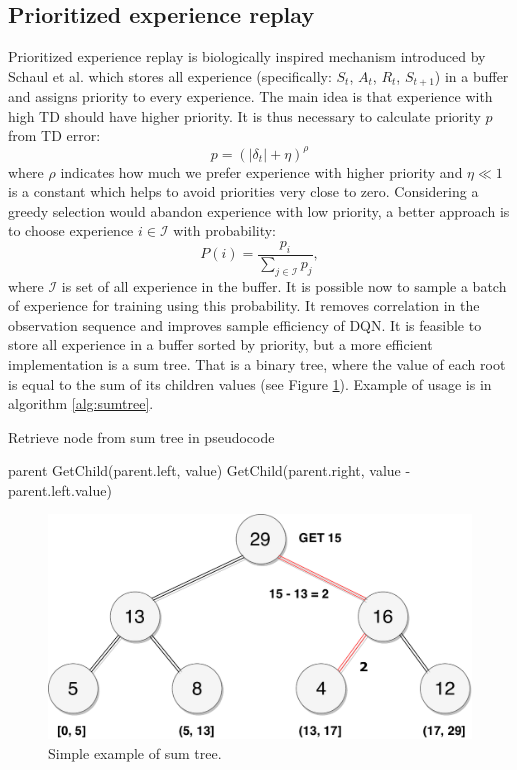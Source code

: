 \clearpage

\subsection{Prioritized experience replay}
Prioritized experience replay is biologically inspired mechanism introduced by Schaul et al. \cite{schaul2015} which stores all experience (specifically: $S_t$, $A_t$, $R_{t}$, $S_{t+1}$) in a buffer and assigns priority to every experience. The main idea is that experience with high TD should have higher priority. It is thus necessary to calculate priority $p$ from TD error:
\begin{equation}
p = (|\delta_t | + \eta)^\rho
\end{equation}
where $\rho$ indicates how much we prefer experience with higher priority and $\eta \ll 1$ is a constant which helps to avoid priorities very close to zero. Considering a greedy selection would abandon experience with low priority, a better approach is to choose experience $i \in \mathcal{I}$ with probability:
\begin{equation}
P(i) = \frac{p_i}{\sum\limits_{j \in \mathcal{I}} p_j},
\end{equation}
where $\mathcal{I}$ is set of all experience in the buffer. It is possible now to sample a batch of experience for training using this probability. It removes correlation in the observation sequence and improves sample efficiency of DQN. It is feasible to store all experience in a buffer sorted by priority, but a more efficient implementation is a sum tree. That is a binary tree, where the value of each root is equal to the sum of its children values (see Figure \ref{fig:sumtree}). Example of usage is in algorithm \ref{alg:sumtree}.
\begin{algorithm}
\caption{Retrieve node from sum tree in pseudocode}
\label{alg:sumtree}
\begin{algorithmic}[1]
 \Return parent \EndIf
{} 
\State \Return GetChild(parent.left, value)
\Else 
\State \Return GetChild(parent.right, value - parent.left.value)
\EndIf
\EndFunction
\end{algorithmic}
\end{algorithm}
\begin{figure}[H]
\centering
\includegraphics[scale=0.5]{fig/sumtree.pdf}
\caption[Sum tree]{Simple example of sum tree.}
\label{fig:sumtree}
\end{figure}
\clearpage
